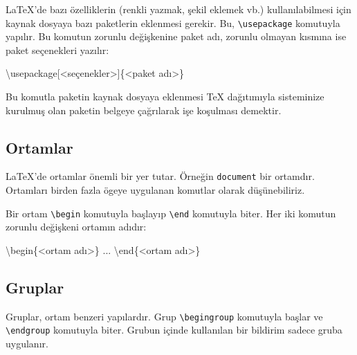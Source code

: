 \documentclass[
  letterpaper,
  DIV=11,
  numbers=noendperiod]{scrreprt}
\newenvironment{Shaded}{\begin{snugshade}}{\end{snugshade}}
\newcommand{\BuiltInTok}[1]{\textcolor[rgb]{0.00,0.23,0.31}{#1}}
\newcommand{\ErrorTok}[1]{\textcolor[rgb]{0.68,0.00,0.00}{#1}}
\newcommand{\ExtensionTok}[1]{\textcolor[rgb]{0.00,0.23,0.31}{#1}}
\newcommand{\KeywordTok}[1]{\textcolor[rgb]{0.00,0.23,0.31}{#1}}
\newcommand{\NormalTok}[1]{\textcolor[rgb]{0.00,0.23,0.31}{#1}}
\begin{document}
{\LaTeX}'de bazı özelliklerin (renkli yazmak, şekil eklemek vb.)
kullanılabilmesi için kaynak dosyaya bazı paketlerin eklenmesi gerekir.
Bu, \texttt{\textbackslash{}usepackage} komutuyla yapılır. Bu komutun
zorunlu değişkenine paket adı, zorunlu olmayan kısmına ise paket
seçenekleri yazılır:

\begin{Shaded}
\begin{Highlighting}[]
\BuiltInTok{\textbackslash{}usepackage}\NormalTok{[\textless{}seçenekler\textgreater{}]\{}\ExtensionTok{\textless{}paket adı\textgreater{}}\NormalTok{\}}
\end{Highlighting}
\end{Shaded}

Bu komutla paketin kaynak dosyaya eklenmesi {\TeX} dağıtımıyla
sisteminize kurulmuş olan paketin belgeye çağrılarak işe koşulması
demektir.

\hypertarget{ortamlar}{%
\subsection{Ortamlar}\label{ortamlar}}

{\LaTeX}'de ortamlar önemli bir yer tutar. Örneğin \texttt{document} bir
ortamdır. Ortamları birden fazla ögeye uygulanan komutlar olarak
düşünebiliriz.

Bir ortam \texttt{\textbackslash{}begin} komutuyla başlayıp
\texttt{\textbackslash{}end} komutuyla biter. Her iki komutun zorunlu
değişkeni ortamın adıdır:

\begin{Shaded}
\begin{Highlighting}[]
\KeywordTok{\textbackslash{}begin}\NormalTok{\{}\ErrorTok{\textless{}}\NormalTok{ortam adı\textgreater{}\}}
\NormalTok{ ...}
\KeywordTok{\textbackslash{}end}\NormalTok{\{}\ErrorTok{\textless{}}\NormalTok{ortam adı\textgreater{}\}}
\end{Highlighting}
\end{Shaded}

\hypertarget{gruplar}{%
\subsection{Gruplar}\label{gruplar}}

Gruplar, ortam benzeri yapılardır. Grup
\texttt{\textbackslash{}begingroup} komutuyla başlar ve
\texttt{\textbackslash{}endgroup} komutuyla biter. Grubun içinde
kullanılan bir bildirim sadece gruba uygulanır.
\end{document}
